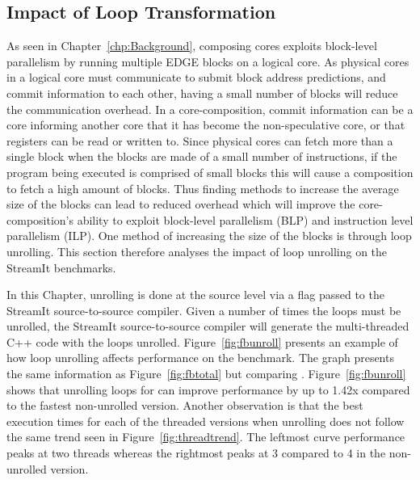 \subsection{Impact of Loop Transformation}
As seen in Chapter~\ref{chp:Background}, composing cores exploits block-level parallelism by running multiple EDGE blocks on a logical core.
As physical cores in a logical core must communicate to submit block address predictions, and commit information to each other, having a small number of blocks will reduce the communication overhead.
In a core-composition, commit information can be a core informing another core that it has become the non-speculative core, or that registers can be read or written to.
Since physical cores can fetch more than a single block when the blocks are made of a small number of instructions, if the program being executed is comprised of small blocks this will cause a composition to fetch a high amount of blocks.
Thus finding methods to increase the average size of the blocks can lead to reduced overhead which will improve the core-composition's ability to exploit block-level parallelism (BLP) and instruction level parallelism (ILP).
One method of increasing the size of the blocks is through loop unrolling.
This section therefore analyses the impact of loop unrolling on the StreamIt benchmarks.

In this Chapter, unrolling is done at the source level via a flag passed to the StreamIt source-to-source compiler.
Given a number of times the loops must be unrolled, the StreamIt source-to-source compiler will generate the multi-threaded C++ code with the loops unrolled.
Figure~\ref{fig:fbunroll} presents an example of how loop unrolling affects performance on the  benchmark.
The graph presents the same information as Figure~\ref{fig:fbtotal} but comparing .
Figure~\ref{fig:fbunroll} shows that unrolling loops for  can improve performance by up to 1.42x compared to the fastest non-unrolled version.
Another observation is that the best execution times for each of the threaded versions when unrolling does not follow the same trend seen in Figure~\ref{fig:threadtrend}.
The leftmost curve performance peaks at two threads whereas the rightmost peaks at 3 compared to 4 in the non-unrolled version.

